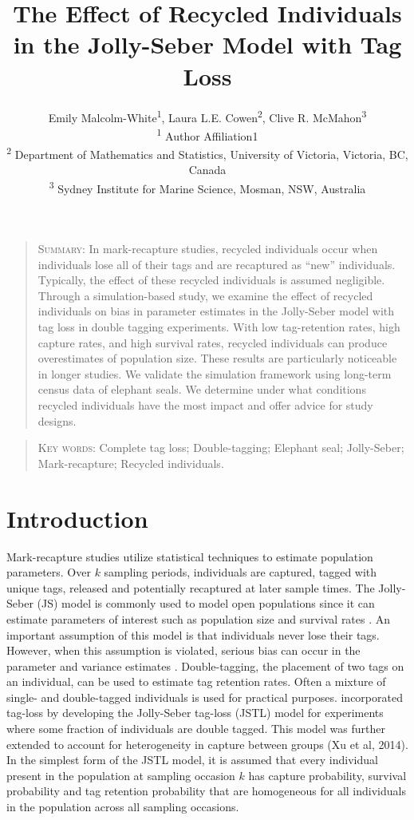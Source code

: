 \documentclass[]{article}
\title{The Effect of Recycled Individuals in the Jolly-Seber Model with Tag
Loss}
\author{Emily Malcolm-White\textsuperscript{1},
        Laura L.E. Cowen\textsuperscript{2}, 
        Clive R. McMahon\textsuperscript{3}\\ 
        \textsuperscript{1} Author Affiliation1\\ 
        \textsuperscript{2} Department of Mathematics and Statistics, University of Victoria, Victoria, BC, Canada\\
        \textsuperscript{3} Sydney Institute for Marine Science, Mosman, NSW, Australia}
\begin{document}
\maketitle


\begin{quote}
\textsc{Summary:} In mark-recapture studies, recycled individuals occur
when individuals lose all of their tags and are recaptured as ``new''
individuals. Typically, the effect of these recycled individuals is
assumed negligible. Through a simulation-based study, we examine the
effect of recycled individuals on bias in parameter estimates in the
Jolly-Seber model with tag loss \citep{Cowen:2006} in double tagging experiments. With low tag-retention
rates, high capture rates, and high survival rates, recycled individuals
can produce overestimates of population size. These results are
particularly noticeable in longer studies. We validate the simulation
framework using long-term census data of elephant seals. We
determine under what conditions recycled individuals have the most
impact and offer advice for study designs.
\end{quote}

\begin{quote}
\begin{center} \textsc{Key words:} Complete tag loss; Double-tagging; Elephant seal; Jolly-Seber; Mark-recapture;   Recycled individuals. 
\end{center}
\end{quote}

\section{Introduction}\label{introduction}

Mark-recapture studies utilize statistical techniques to estimate
population parameters. Over \(k\) sampling
periods, individuals are captured, tagged with unique tags, released and potentially
recaptured at later sample times. The Jolly-Seber (JS) model \citep{Jolly:1965, Seber:1965}
 is commonly used to model open populations since it
can estimate parameters of interest such as population size and survival
rates \citep{Pollock:1990}. An important assumption of this model is that 
individuals never lose their tags. However, when this assumption is
violated, serious bias can occur in the parameter and variance estimates
\citep{Arnason:1981}. Double-tagging, the placement of two tags on
an individual, can be used to estimate tag retention rates. Often a
mixture of single- and double-tagged individuals is used for practical
purposes. \cite{Cowen:2006} incorporated tag-loss by developing
the Jolly-Seber tag-loss (JSTL) model for experiments where some
fraction of individuals are double tagged. This model was further
extended to account for heterogeneity in capture between groups (Xu et
al, 2014). In the simplest form of the JSTL model, it is assumed that
every individual present in the population at sampling occasion \(k\)
has capture probability, survival probability and tag retention
probability that are homogeneous for all individuals in the population
across all sampling occasions.
\end{document}
